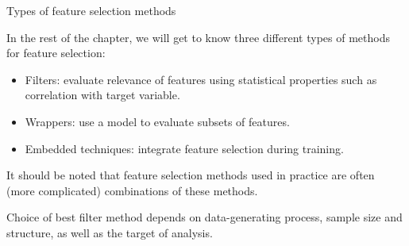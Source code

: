 \documentclass[11pt,compress,t,notes=noshow, xcolor=table]{beamer}
\begin{document}
  \begin{vbframe}{Types of feature selection methods}

  In the rest of the chapter, we will get to know three different types of methods for feature selection:

  \lz

  \begin{itemize}
    \item Filters: evaluate relevance of features using statistical properties such as correlation with target variable.
    \item Wrappers: use a model to evaluate subsets of features. 
    \item Embedded techniques: integrate feature selection during training.
  \end{itemize}

  \lz

  It should be noted that feature selection methods used in practice are often (more complicated) combinations of these methods.
  
  \lz
  
  Choice of best filter method depends on data-generating process, sample size and structure, as well as the target of analysis.

  \end{vbframe}

  \endlecture
\end{document}
